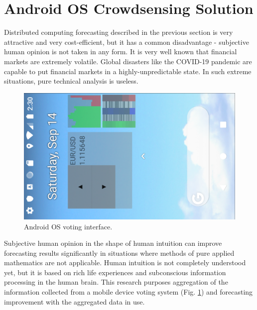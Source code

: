 \documentclass[runningheads]{llncs}
\begin{document}
\section{Android OS Crowdsensing Solution}
%
Distributed computing forecasting described in the previous section is very attractive and very cost-efficient, but it has a common disadvantage - subjective human opinion is not taken in any form. It is very well known that financial markets are extremely volatile. Global disasters like the COVID-19 pandemic are capable to put financial markets in a highly-unpredictable state. In such extreme situations, pure technical analysis is useless. 
%
\begin{figure}
\includegraphics[width=\textwidth]{fig04.png}
\caption{Android OS voting interface.}
\label{fig04}
\end{figure}
%
Subjective human opinion in the shape of human intuition can improve forecasting results significantly in situations where methods of pure applied mathematics are not applicable. Human intuition is not completely understood yet, but it is based on rich life experiences and subconscious information processing in the human brain. This research purposes aggregation of the information collected from a mobile device voting system (Fig. \ref{fig04}) and forecasting improvement with the aggregated data in use.
\end{document}
